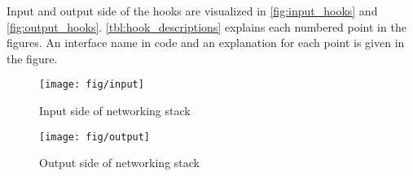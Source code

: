 Input and output side of the hooks are visualized in
\autoref{fig:input_hooks} and \autoref{fig:output_hooks}.
\autoref{tbl:hook_descriptions} explains each numbered point in the
figures. An interface name in code and an explanation for each point
is given in the figure.

\begin{figure}
   \begin{minipage}[b]{0.4\textwidth}
      \centering
      \texttt{[image: fig/input]}
      \caption{Input side of networking stack}
      \label{fig:input_hooks}
   \end{minipage}%
   \hfill%
   \begin{minipage}[b]{0.9\textwidth}
      \centering
      \centering
      \texttt{[image: fig/output]}
      \caption{Output side of networking stack}
      \label{fig:output_hooks}
   \end{minipage}%
\end{figure}


